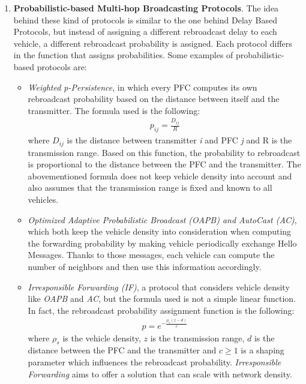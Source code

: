 \begin{enumerate}
				\item \textbf{Probabilistic-based Multi-hop Broadcasting Protocols}.
				The idea behind these kind of protocols is similar to the one behind Delay Based Protocols, but instead of assigning a different rebroadcast delay to each vehicle, a different rebroadcast probability is assigned. Each protocol differs in the function that assigns probabilities. Some examples of probabilistic-based protocols are:
				\begin{itemize}
					\renewcommand\labelitemi{--}
					\item \textit{Weighted p-Persistence}\cite{4407231}, in which every PFC computes its own rebroadcast probability based on the distance between itself and the transmitter. The formula used is the following:
					\begin{gather}
						p_{ij} = \frac{D_{ij}}{R}
						\label{eq:weighted-p-persistence}
					\end{gather}
					where $D_{ij}$ is the distance between transmitter \textit{i} and PFC \textit{j} and R is the transmission range. Based on this function, the probability to rebroadcast is proportional to the distance between the PFC and the transmitter. The abovementioned formula does not keep vehicle density into account and also assumes that the transmission range is fixed and known to all vehicles.
					
					\item \textit{Optimized Adaptive Probabilistic Broadcast (OAPB)\cite{1543865} and AutoCast (AC)\cite{4350058}}, which both keep the vehicle density into consideration when computing the forwarding probability by making vehicle periodically exchange Hello Messages. Thanks to those messages, each vehicle can compute the number of neighbors and then use this information accordingly.
					
					\item \textit{Irresponsible Forwarding (IF)}\cite{4740277}\cite{5426212}, a protocol that considers vehicle density like \textit{OAPB} and \textit{AC}, but the formula used is not a simple linear function. In fact, the rebroadcast probability assignment function is the following:
					\begin{gather}
						p = e^{-\frac{\rho_s(z-d)}{c}}
					\end{gather}
					where $\rho_s$ is the vehicle density, $z$ is the transmission range, $d$ is the distance between the PFC and the transmitter and $c\geq1$ is a shaping parameter which influences the rebroadcast probability. \textit{Irresponsible Forwarding} aims to offer a solution that can scale with network density.
				\end{itemize}
			\end{enumerate}
			
